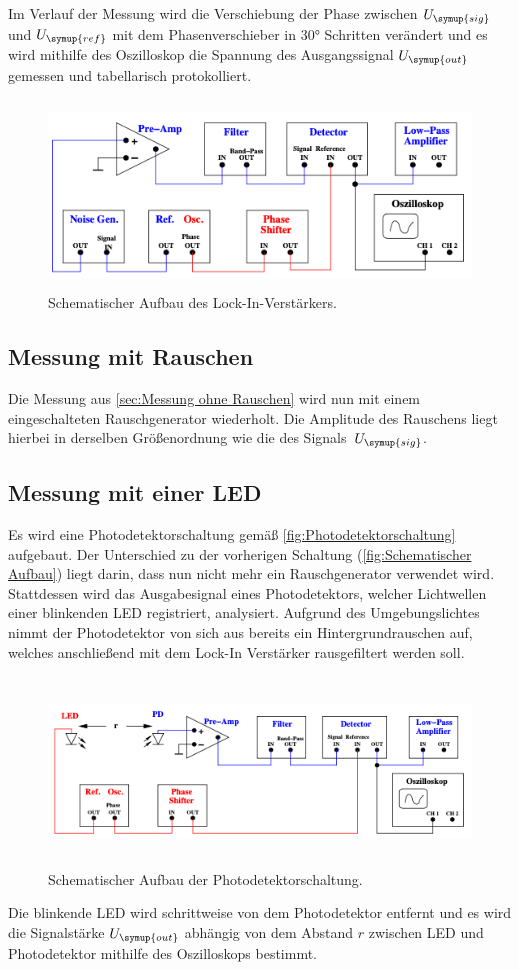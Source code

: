 Im Verlauf der Messung wird die Verschiebung der Phase zwischen $U_{\symup{sig}}$ und $U_{\symup{ref}}$ mit dem Phasenverschieber
in 30° Schritten verändert und es wird mithilfe des Oszilloskop die Spannung des Ausgangssignal $U_{\symup{out}}$ gemessen und tabellarisch
protokolliert.

\begin{figure} [H]
    \centering
    \includegraphics[height=5cm]{content/Bilder/Aufbau_Schema.png}
    \caption{Schematischer Aufbau des Lock-In-Verstärkers.\cite{v303}}
    \label{fig:Schematischer Aufbau}
\end{figure}

\subsection{Messung mit Rauschen}
\label{sec:Messung mit Rauschen}
Die Messung aus \ref{sec:Messung ohne Rauschen} wird nun mit einem eingeschalteten Rauschgenerator wiederholt. Die Amplitude
des Rauschens liegt hierbei in derselben Größenordnung wie die des Signals~$U_{\symup{sig}}$.


\subsection{Messung mit einer LED}
\label{sec:Messung mit einer LED}
Es wird eine Photodetektorschaltung gemäß \autoref{fig:Photodetektorschaltung} aufgebaut. Der Unterschied zu der vorherigen 
Schaltung (\autoref{fig:Schematischer Aufbau}) liegt darin, dass nun nicht mehr ein Rauschgenerator verwendet wird. Stattdessen
wird das Ausgabesignal eines Photodetektors, welcher Lichtwellen einer blinkenden LED registriert, analysiert.
Aufgrund des Umgebungslichtes nimmt der Photodetektor von sich aus bereits ein Hintergrundrauschen auf, welches
anschließend mit dem Lock-In Verstärker rausgefiltert werden soll.

\begin{figure} [H]
    \centering
    \includegraphics[height=5cm]{content/Bilder/Aufbau_led.png}
    \caption{Schematischer Aufbau der Photodetektorschaltung.\cite{v303}}
    \label{fig:Photodetektorschaltung}
\end{figure}

Die blinkende LED wird schrittweise von dem Photodetektor entfernt und es wird die Signalstärke $U_{\symup{out}}$ abhängig von dem 
Abstand $r$ zwischen LED und Photodetektor mithilfe des Oszilloskops bestimmt.